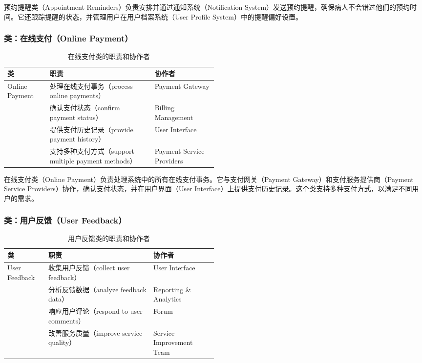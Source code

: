 预约提醒类（Appointment Reminders）负责安排并通过通知系统（Notification System）发送预约提醒，确保病人不会错过他们的预约时间。它还跟踪提醒的状态，并管理用户在用户档案系统（User Profile System）中的提醒偏好设置。

\subsubsection{类：在线支付（Online Payment）}
\begin{table}[htbp]
	\centering
	\begin{tabular}{|l|p{0.5\linewidth}|l|}
		\hline
		\textbf{类} & \textbf{职责} & \textbf{协作者} \\
		\hline
		Online Payment & 处理在线支付事务（process online payments） & Payment Gateway \\
		& 确认支付状态（confirm payment status） & Billing Management \\
		& 提供支付历史记录（provide payment history） & User Interface \\
		& 支持多种支付方式（support multiple payment methods） & Payment Service Providers \\
		\hline
	\end{tabular}
	\caption{在线支付类的职责和协作者}
	\label{tab:online_payment}
\end{table}

在线支付类（Online Payment）负责处理系统中的所有在线支付事务。它与支付网关（Payment Gateway）和支付服务提供商（Payment Service Providers）协作，确认支付状态，并在用户界面（User Interface）上提供支付历史记录。这个类支持多种支付方式，以满足不同用户的需求。

\subsubsection{类：用户反馈（User Feedback）}
\begin{table}[htbp]
	\centering
	\begin{tabular}{|l|p{0.5\linewidth}|l|}
		\hline
		\textbf{类} & \textbf{职责} & \textbf{协作者} \\
		\hline
		User Feedback & 收集用户反馈（collect user feedback） & User Interface \\
		& 分析反馈数据（analyze feedback data） & Reporting \& Analytics \\
		& 响应用户评论（respond to user comments） & Forum \\
		& 改善服务质量（improve service quality） & Service Improvement Team \\
		\hline
	\end{tabular}
	\caption{用户反馈类的职责和协作者}
	\label{tab:user_feedback}
\end{table}

